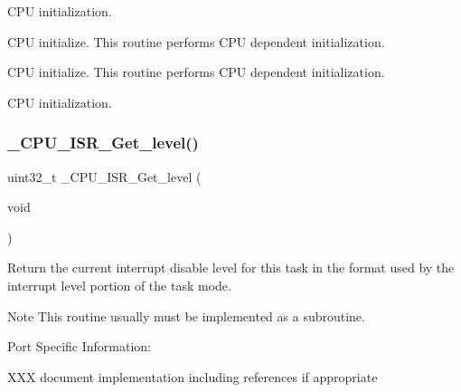 C\+PU initialization. 

C\+PU initialize. This routine performs C\+PU dependent initialization.

C\+PU initialize. This routine performs C\+PU dependent initialization.

C\+PU initialization. \mbox{\label{group__RTEMSScoreCPUi386_ga1d9dcab9170d532b6634a5620385adbd}} 
\subsubsection{\texorpdfstring{\_CPU\_ISR\_Get\_level()}{\_CPU\_ISR\_Get\_level()}}
{\footnotesize\ttfamily uint32\+\_\+t \+\_\+\+C\+P\+U\+\_\+\+I\+S\+R\+\_\+\+Get\+\_\+level (\begin{DoxyParamCaption}\item[{void}]{ }\end{DoxyParamCaption})}

Return the current interrupt disable level for this task in the format used by the interrupt level portion of the task mode.

\begin{DoxyNote}{Note}
This routine usually must be implemented as a subroutine.
\end{DoxyNote}
Port Specific Information\+:

X\+XX document implementation including references if appropriate 